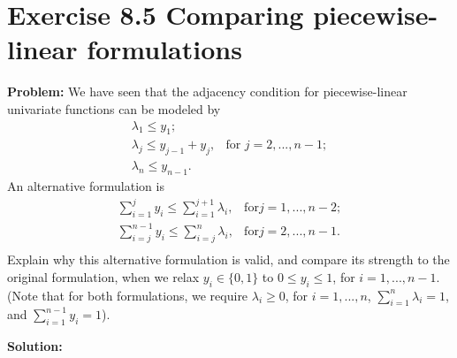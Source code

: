 \section{Exercise 8.5 Comparing piecewise-linear formulations}
\textbf{Problem:} We have seen that the adjacency condition for piecewise-linear univariate functions can be modeled by
\begin{equation}
\label{eq: orisystem}
  \begin{array}{lrcll}
    \lambda_1\leq{}y_1; &\\
    \lambda_j\leq{}y_{j-1}+y_j, & \text{for } j=2,...,n-1;\\
    \lambda_n\leq{}y_{n-1}. &
  \end{array}
\end{equation}
An alternative formulation is
\begin{equation}
\label{eq: altsystem}
  \begin{array}{lrcll}
   \sum_{i=1}^{j} y_i\leq{}\sum_{i=1}^{j+1} \lambda_i, & \text{for} j=1,...,n-2;\\
   \sum_{i=j}^{n-1} y_i\leq{}\sum_{i=j}^{n} \lambda_i, & \text{for} j=2,...,n-1.\\
  \end{array}
\end{equation}
Explain why this alternative formulation is valid, and compare its strength to the original formulation, when we relax $y_i\in\lbrace0,1\rbrace$ to $0\leq{}y_i\leq1$, for $i=1,...,n−1$. (Note that for both formulations, we require $\lambda_i\geq0$, for $i=1,...,n$, $\sum_{i=1}^{n} \lambda_i=1$, and
$\sum_{i=1}^{n-1} y_i=1$).

\textbf{Solution:} 